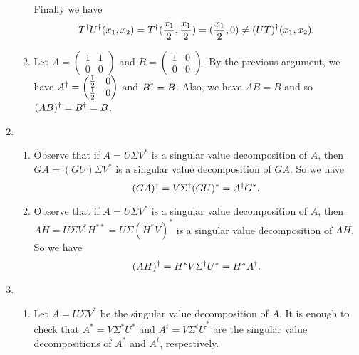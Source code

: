 \begin{enumerate}
\begin{enumerate}
Finally we have 
\[T^{\dagger} U^{\dagger}(x_1,x_2)=T^{\dagger}(\frac{x_1}{2},\frac{x_1}{2})=(\frac{x_1}{2},0)\neq (UT)^{\dagger}(x_1,x_2).\]
\item Let $A=\begin{pmatrix}1&1\\0&0\end{pmatrix}$ and $B=\begin{pmatrix}1&0\\0&0\end{pmatrix}$. By the previous argument, we have $A^{\dagger}=\begin{pmatrix}\frac{1}{2}&0\\\frac{1}{2}&0\end{pmatrix}$ and $B^{\dagger} =B$. Also, we have $AB=B$ and so $(AB)^{\dagger}=B^{\dagger}=B$.
\end{enumerate}
\item \begin{enumerate}
\item Observe that if $A=U\Sigma V^*$ is a singular value decomposition of $A$, then $GA=(GU)\Sigma V^*$ is a singular value decomposition of $GA$. So we have 
\[(GA)^{\dagger} =V\Sigma ^{\dagger} (GU)^*=A^{\dagger} G^*.\]
\item Observe that if $A=U\Sigma V^*$ is a singular value decomposition of $A$, then $AH=U\Sigma V^*H^{**}=U\Sigma (H^*V)^*$ is a singular value decomposition of $AH$. So we have 
\[(AH)^{\dagger} =H^*V\Sigma ^{\dagger} U^*=H^*A^{\dagger}.\]
\end{enumerate}
\item \begin{enumerate}
\item Let $A = U\Sigma V^*$ be the singular value decomposition of $A$.  It is enough to check that $A^* = V\Sigma^* U^*$ and $A^t = \overline{V}\Sigma^t\overline{U}^*$ are the singular value decompositions of $A^*$ and $A^t$, respectively.  


\end{enumerate}
\end{enumerate}

